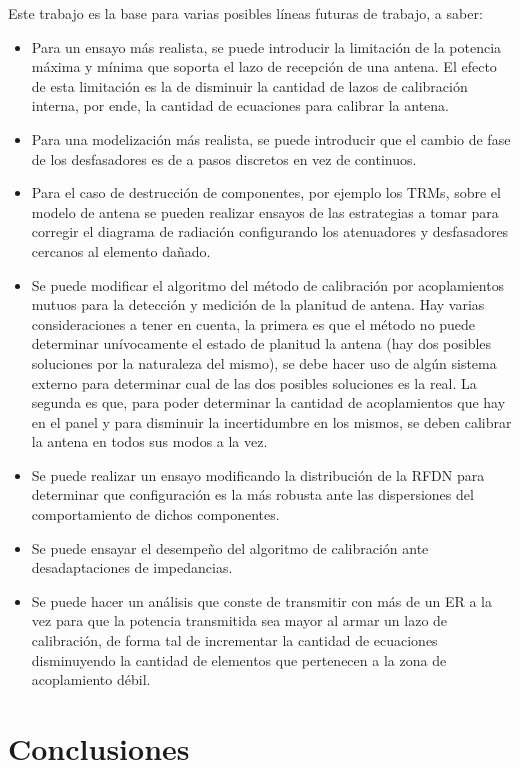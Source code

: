 Este trabajo es la base para varias posibles líneas futuras de trabajo, a saber:
\begin{itemize}
	\item Para un ensayo más realista, se puede introducir la limitación de la potencia máxima y mínima que soporta el lazo 
		de recepción de una antena. El efecto de esta limitación es la de disminuir la cantidad de lazos de calibración interna, 
		por ende, la cantidad de ecuaciones para calibrar la antena.
	\item Para una modelización más realista, se puede introducir que el cambio de fase de los desfasadores es de a pasos discretos
		en vez de continuos.
	\item Para el caso de destrucción de componentes, por ejemplo los TRMs, sobre el modelo de antena se pueden realizar ensayos 
		de las estrategias a tomar para corregir el diagrama de radiación configurando los atenuadores y desfasadores cercanos al 
		elemento dañado.
	\item Se puede modificar el algoritmo del método de calibración por acoplamientos mutuos para la detección y medición de 
		la planitud de antena. Hay varias consideraciones a tener en cuenta, la primera es que el método no puede determinar 
		unívocamente el estado de planitud la antena (hay dos posibles soluciones por la naturaleza del mismo), se debe hacer uso de 
		algún sistema externo para determinar cual de las dos posibles soluciones es la real. La segunda es que, para poder determinar
		la cantidad de acoplamientos que hay en el panel y para disminuir la incertidumbre en los mismos, se deben calibrar la antena 
		en todos sus modos a la vez.
	\item Se puede realizar un ensayo modificando la distribución de la RFDN para determinar que configuración es la más robusta ante 
		las dispersiones del comportamiento de dichos componentes.
	\item Se puede ensayar el desempeño del algoritmo de calibración ante desadaptaciones de impedancias. 
	\item Se puede hacer un análisis que conste de transmitir con más de un ER a la vez para que la potencia transmitida sea mayor
		al armar un lazo de calibración, de forma tal de incrementar la cantidad de ecuaciones disminuyendo la cantidad de
		elementos que pertenecen a la zona de acoplamiento débil. 
\end{itemize}

\section{Conclusiones}

